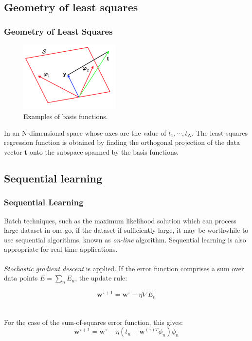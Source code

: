 \documentclass{beamer}
\begin{document}
\subsection{Geometry of least squares}


\begin{frame}
\frametitle{Geometry of Least Squares}
\begin{figure}
\includegraphics[width=5cm]{Figure2}
\caption{Examples of basis functions.}
\end{figure}

In an N-dimensional space whose axes are the value of $t_1,\cdots,t_N$. The least-squares regression function is obtained by finding the orthogonal projection of the data vector $\bm{t}$ onto the subspace spanned by the basis functions.

\end{frame}


\subsection{Sequential learning} 


\begin{frame}
\frametitle{Sequential Learning}
Batch techniques, such as the maximum likelihood solution which can process large dataset in one go, if the dataset if sufficiently large, it may be worthwhile to use sequential algorithms, known as \textit{on-line} algorithm. Sequential learning is also appropriate for real-time applications.\\~\\

\textit{Stochastic gradient descent} is applied. If the error function  comprises a sum over data points $E = \sum_n E_n$, the update rule:

\begin{equation}
\bm{w}^{\tau+1}=\bm{w}^{\tau}-\eta \nabla E_n
\end{equation}\\~\\

For the case of  the sum-of-squares error function, this gives:
\begin{equation}
\bm{w}^{\tau+1}=\bm{w}^{\tau}-\eta (t_n - \bm{w}^{(\tau)T}\phi_n)\phi_n
\end{equation}

\end{frame}
\end{document}

